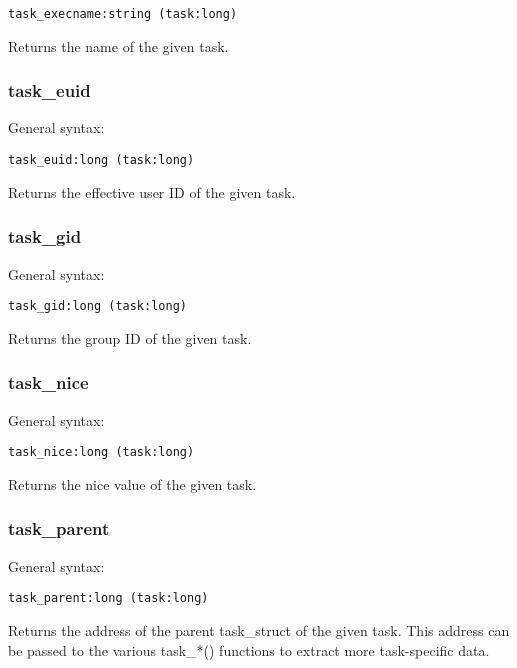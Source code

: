\documentclass[twoside,english]{article}
\newenvironment{vindent}
{\begin{list}{}{\setlength{\listparindent}{6pt}}
\item[]}
{\end{list}}
\begin{document}
\begin{vindent}
\begin{verbatim}
task_execname:string (task:long)
\end{verbatim}
\end{vindent}
Returns the name of the given task.


\subsubsection{task\_euid}
General syntax:

\begin{vindent}
\begin{verbatim}
task_euid:long (task:long)
\end{verbatim}
\end{vindent}
Returns the effective user ID of the given task.


\subsubsection{task\_gid}
General syntax:

\begin{vindent}
\begin{verbatim}
task_gid:long (task:long)
\end{verbatim}
\end{vindent}
Returns the group ID of the given task.


\subsubsection{task\_nice}
General syntax:

\begin{vindent}
\begin{verbatim}
task_nice:long (task:long)
\end{verbatim}
\end{vindent}
Returns the nice value of the given task.


\subsubsection{task\_parent}
General syntax:

\begin{vindent}
\begin{verbatim}
task_parent:long (task:long)
\end{verbatim}
\end{vindent}
Returns the address of the parent task\_struct of the given
task. This address can be passed to the various task\_{*}() functions to
extract more task-specific data.
\end{document}
